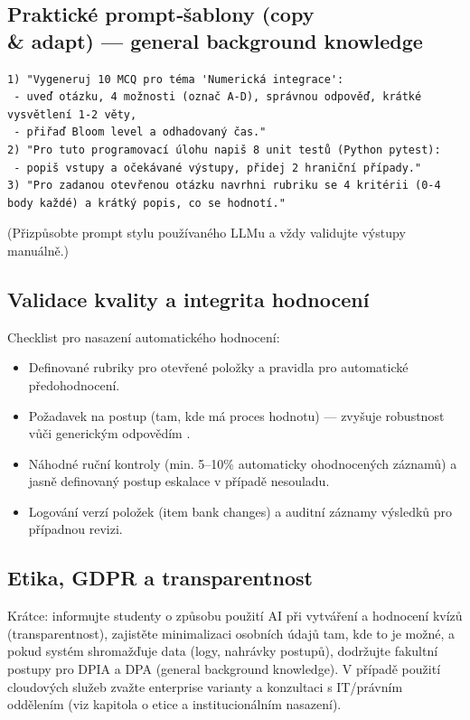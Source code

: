\documentclass{report}%
\begin{document}
\subsection*{Praktické prompt‑šablony (copy \\ \& adapt) — general background knowledge}
\begin{verbatim}
1) "Vygeneruj 10 MCQ pro téma 'Numerická integrace':
 - uveď otázku, 4 možnosti (označ A-D), správnou odpověď, krátké vysvětlení 1-2 věty,
 - přiřaď Bloom level a odhadovaný čas."
2) "Pro tuto programovací úlohu napiš 8 unit testů (Python pytest): 
 - popiš vstupy a očekávané výstupy, přidej 2 hraniční případy."
3) "Pro zadanou otevřenou otázku navrhni rubriku se 4 kritérii (0-4 body každé) a krátký popis, co se hodnotí."
\end{verbatim}
(Přizpůsobte prompt stylu používaného LLMu a vždy validujte výstupy manuálně.)

\subsection*{Validace kvality a integrita hodnocení}
Checklist pro nasazení automatického hodnocení:
\begin{itemize}
  \item Definované rubriky pro otevřené položky a pravidla pro automatické předohodnocení.
  \item Požadavek na postup (tam, kde má proces hodnotu) — zvyšuje robustnost vůči generickým odpovědím \cite{kb_ai_101_tipu_pdf_04e4a115_page_8_1}.
  \item Náhodné ruční kontroly (min. 5–10\% automaticky ohodnocených záznamů) a jasně definovaný postup eskalace v případě nesouladu.
  \item Logování verzí položek (item bank changes) a auditní záznamy výsledků pro případnou revizi.
\end{itemize}

\subsection*{Etika, GDPR a transparentnost}
Krátce: informujte studenty o způsobu použití AI při vytváření a hodnocení kvízů (transparentnost), zajistěte minimalizaci osobních údajů tam, kde to je možné, a pokud systém shromažďuje data (logy, nahrávky postupů), dodržujte fakultní postupy pro DPIA a DPA (general background knowledge). V případě použití cloudových služeb zvažte enterprise varianty a konzultaci s IT/právním oddělením (viz kapitola o etice a institucionálním nasazení).
\end{document}
